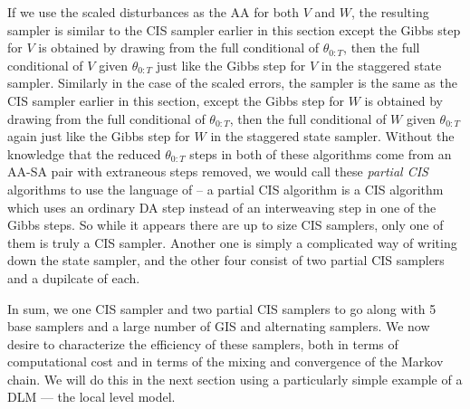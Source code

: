 \documentclass{article}
\begin{document}
If we use the scaled disturbances as the AA for both $V$ and $W$, the resulting sampler is similar to the CIS sampler earlier in this section except the Gibbs step for $V$ is obtained by drawing from the full conditional of $\theta_{0:T}$, then the full conditional of $V$ given $\theta_{0:T}$ just like the Gibbs step for $V$ in the staggered state sampler. Similarly in the case of the scaled errors, the sampler is the same as the CIS sampler earlier in this section, except the Gibbs step for $W$ is obtained by drawing from the full conditional of $\theta_{0:T}$, then the full conditional of $W$ given $\theta_{0:T}$ again just like the Gibbs step for $W$ in the staggered state sampler. Without the knowledge that the reduced $\theta_{0:T}$ steps in both of these algorithms come from an AA-SA pair with extraneous steps removed, we would call these {\it partial CIS} algorithms to use the language of  -- a partial CIS algorithm is a CIS algorithm which uses an ordinary DA step instead of an interweaving step in one of the Gibbs steps. So while it appears there are up to size CIS samplers, only one of them is truly a CIS sampler. Another one is simply a complicated way of writing down the state sampler, and the other four consist of two partial CIS samplers and a dupilcate of each.

In sum, we one CIS sampler and two partial CIS samplers to go along with 5 base samplers and a large number of GIS and alternating samplers. We now desire to characterize the efficiency of these samplers, both in terms of computational cost and in terms of the mixing and convergence of the Markov chain. We will do this in the next section using a particularly simple example of a DLM --- the local level model.

\clearpage


\end{document}
